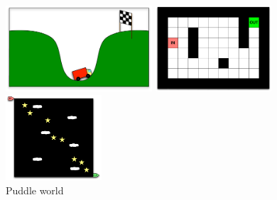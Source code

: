 \begin{figure}[ht!]
\begin{minipage}[t]{0.31\linewidth}
\center
\includegraphics[height=3.2cm]{MC_problem.pdf}
\caption{Mountain car
}\label{fig:MC:problem}
\end{minipage}
\hspace{0.1mm}
\begin{minipage}[t]{0.25\linewidth}
\center
\includegraphics[height=3.2cm]{MZ_problem.pdf}
\caption{Maze
}\label{fig:MC:problem}
\end{minipage}
\hspace{0.1mm}
\begin{minipage}[t]{0.22\linewidth}
\center
\includegraphics[height=3.2cm]{PW_problem.pdf}
\caption{Puddle world
}\label{fig:MC:problem}
\end{minipage}
\hspace{0.1mm}
\begin{minipage}[t]{0.19\linewidth}

\end{minipage}
\end{figure}
